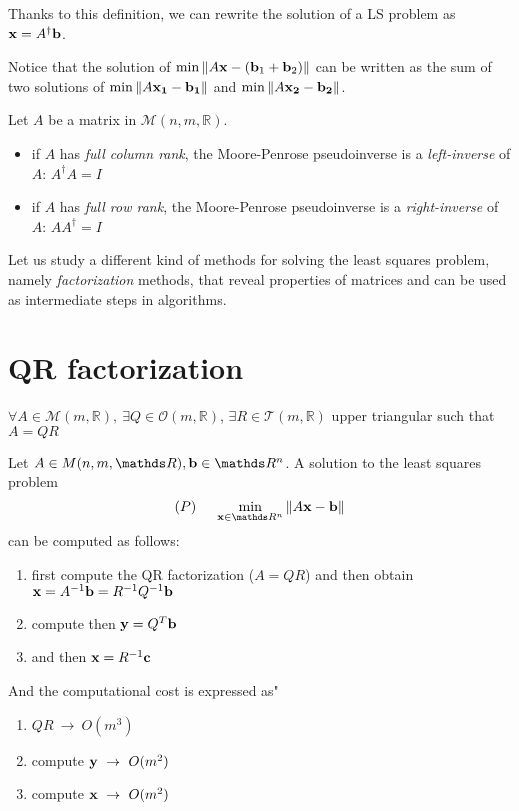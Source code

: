 \documentclass[computationalMathematics.tex]{subfiles}
\begin{document}
Thanks to this definition, we can rewrite the solution of a LS problem as ${\bf x }={A}^{\dag} {\bf b }$.

Notice that the solution of $\min \left\lVert A {\bf x } - ({{\bf b }}_{1} + {{\bf b }}_{2})\right\rVert$ can be written as the sum of two solutions of $\min \left\lVert A {\bf {x}_{1} } - {\bf b_{1} }\right\rVert$ and  $\min \left\lVert A {\bf x_{2} } - {\bf b_{2} }\right\rVert$.

\begin{proposition}
	Let $A$ be a matrix in $\mathcal{M}(n, m, \mathds{R})$.
	\begin{itemize}
		\item if $A$ has \emph{full column rank}, the Moore-Penrose pseudoinverse is a \emph{left-inverse} of $A$: ${A}^{\dag} A = I$
		\item if $A$ has \emph{full row rank}, the Moore-Penrose pseudoinverse is a \emph{right-inverse} of $A$: $A {A}^{\dag} = I$
	\end{itemize}
\end{proposition}

Let us study a different kind of methods for solving the least squares problem, namely \emph{factorization} methods, that reveal properties of matrices and can be used as intermediate steps in algorithms.

\section{QR factorization}

\begin{theorem}[QR factorization]
  $\forall A \in \mathcal{M}(m, \mathds{R}),~ \exists  Q \in \mathcal{O}(m, \mathds{R})$, $\exists R \in \mathcal{T}(m, \mathds{R})$ upper triangular such that $A=QR$
\end{theorem}

\begin{proposition}
	Let $A \in M(n,m, \R), \vect{b} \in \R^n$. A solution to the least squares problem
	\[
	 	(P) ~ ~ ~ ~ \min\limits_{\vect{x} \in \R^n} \norm{A \vect{x} - \vect{b}}
	\]
	can be computed as follows:
	\begin{enumerate}
		\item first compute the QR factorization ($A=QR$) and then obtain 
		${\bf x } = {A}^{-1} {\bf b } = {R}^{-1} {Q}^{-1} {\bf b }$
		\item compute then ${\bf y } = {Q}^{T} {\bf b }$
		\item and then ${\bf x } = {R}^{-1} {\bf c }$
	\end{enumerate}
	And the computational cost is expressed as"
	\begin{enumerate}
		\item $QR ~ \rightarrow ~ O({m}^{3})$
		\item compute  ${\bf y } ~ \rightarrow ~ O({m}^{2})$
		\item compute $ {\bf x } ~ \rightarrow ~ O({m}^{2})$
	\end{enumerate}
\end{proposition}
\end{document}
